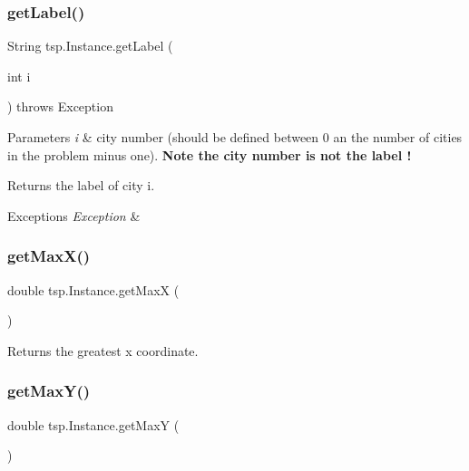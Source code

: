 \subsubsection{\texorpdfstring{get\+Label()}{getLabel()}}
{\footnotesize\ttfamily String tsp.\+Instance.\+get\+Label (\begin{DoxyParamCaption}\item[{int}]{i }\end{DoxyParamCaption}) throws Exception\hspace{0.3cm}{\ttfamily [inline]}}


\begin{DoxyParams}{Parameters}
{\em i} & city number (should be defined between 0 an the number of cities in the problem minus one). {\bfseries Note the city number is not the label !} \\
\hline
\end{DoxyParams}
\begin{DoxyReturn}{Returns}
the label of city i. 
\end{DoxyReturn}

\begin{DoxyExceptions}{Exceptions}
{\em Exception} & \\
\hline
\end{DoxyExceptions}
\mbox{\label{classtsp_1_1_instance_ace537c157ffb558343c9a38796987dd1}} 
\subsubsection{\texorpdfstring{get\+Max\+X()}{getMaxX()}}
{\footnotesize\ttfamily double tsp.\+Instance.\+get\+MaxX (\begin{DoxyParamCaption}{ }\end{DoxyParamCaption})\hspace{0.3cm}{\ttfamily [inline]}}

\begin{DoxyReturn}{Returns}
the greatest x coordinate. 
\end{DoxyReturn}
\mbox{\label{classtsp_1_1_instance_aff99be18538e727e6aa8b9de7c96f781}} 
\subsubsection{\texorpdfstring{get\+Max\+Y()}{getMaxY()}}
{\footnotesize\ttfamily double tsp.\+Instance.\+get\+MaxY (\begin{DoxyParamCaption}{ }\end{DoxyParamCaption})\hspace{0.3cm}{\ttfamily [inline]}}

